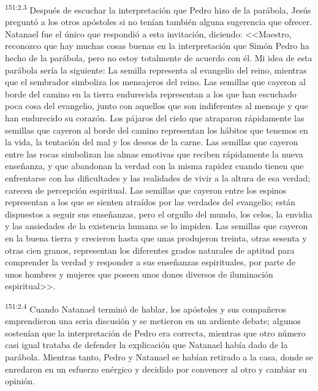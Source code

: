 \par 
\textsuperscript{151:2.3} Después de escuchar la interpretación que Pedro hizo de la parábola, Jesús preguntó a los otros apóstoles si no tenían también alguna sugerencia que ofrecer. Natanael fue el único que respondió a esta invitación, diciendo: <<Maestro, reconozco que hay muchas cosas buenas en la interpretación que Simón Pedro ha hecho de la parábola, pero no estoy totalmente de acuerdo con él. Mi idea de esta parábola sería la siguiente: La semilla representa al evangelio del reino, mientras que el sembrador simboliza los mensajeros del reino. Las semillas que cayeron al borde del camino en la tierra endurecida representan a los que han escuchado poca cosa del evangelio, junto con aquellos que son indiferentes al mensaje y que han endurecido su corazón. Los pájaros del cielo que atraparon rápidamente las semillas que cayeron al borde del camino representan los hábitos que tenemos en la vida, la tentación del mal y los deseos de la carne. Las semillas que cayeron entre las rocas simbolizan las almas emotivas que reciben rápidamente la nueva enseñanza, y que abandonan la verdad con la misma rapidez cuando tienen que enfrentarse con las dificultades y las realidades de vivir a la altura de esa verdad; carecen de percepción espiritual. Las semillas que cayeron entre los espinos representan a los que se sienten atraídos por las verdades del evangelio; están dispuestos a seguir sus enseñanzas, pero el orgullo del mundo, los celos, la envidia y las ansiedades de la existencia humana se lo impiden. Las semillas que cayeron en la buena tierra y crecieron hasta que unas produjeron treinta, otras sesenta y otras cien granos, representan los diferentes grados naturales de aptitud para comprender la verdad y responder a sus enseñanzas espirituales, por parte de unos hombres y mujeres que poseen unos dones diversos de iluminación espiritual>>.

\par 
\textsuperscript{151:2.4} Cuando Natanael terminó de hablar, los apóstoles y sus compañeros emprendieron una seria discusión y se metieron en un ardiente debate; algunos sostenían que la interpretación de Pedro era correcta, mientras que otro número casi igual trataba de defender la explicación que Natanael había dado de la parábola. Mientras tanto, Pedro y Natanael se habían retirado a la casa, donde se enredaron en un esfuerzo enérgico y decidido por convencer al otro y cambiar su opinión.

